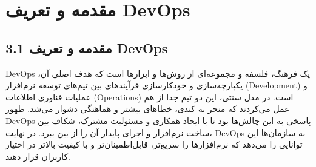 \section{مقدمه و تعریف DevOps}
\subsection*{3.1 مقدمه و تعریف DevOps}
DevOps یک فرهنگ، فلسفه و مجموعه‌ای از روش‌ها و ابزارها است که هدف اصلی آن، یکپارچه‌سازی و خودکارسازی فرآیندهای بین تیم‌های توسعه نرم‌افزار (Development) و عملیات فناوری اطلاعات (Operations) است. در مدل سنتی، این دو تیم جدا از هم عمل می‌کردند که منجر به کندی، خطاهای بیشتر و هماهنگی دشوار می‌شد. ظهور DevOps پاسخی به این چالش‌ها بود تا با ایجاد همکاری و مسئولیت مشترک، شکاف بین ساخت نرم‌افزار و اجرای پایدار آن را از بین ببرد. در نهایت، DevOps به سازمان‌ها این توانایی را می‌دهد که نرم‌افزارها را سریع‌تر، قابل‌اطمینان‌تر و با کیفیت بالاتر در اختیار کاربران قرار دهند.

